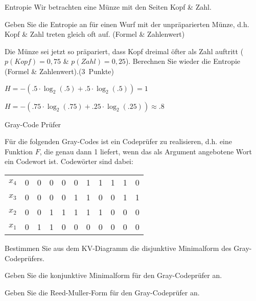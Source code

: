\documentclass{exercisesheet}
\begin{document}
\begin{eexercises}{Entropie}{
    Wir betrachten eine Münze mit den Seiten Kopf \& Zahl.
  }
  \item Geben Sie die Entropie an für einen Wurf mit der unpräparierten Münze, d.h. Kopf \& Zahl treten gleich oft auf. (Formel \& Zahlenwert)\points[3]
  \item Die Münze sei jetzt so präpariert, dass Kopf dreimal öfter als Zahl auftritt ($p(Kopf) = 0,75$ \& $p(Zahl) = 0,25$). Berechnen Sie wieder die Entropie (Formel \& Zahlenwert).(3~Punkte)
\end{eexercises}

\begin{solutions}
  \item $H = -(.5\cdot\log_2(.5) + .5\cdot\log_2(.5)) = 1$
  \item $H = -(.75\cdot\log_2(.75) + .25\cdot\log_2(.25)) \approx .8$
\end{solutions}

\begin{eexercises}{Gray-Code Prüfer}{
    Für die folgenden Gray-Codes ist ein Codeprüfer zu realisieren, d.h. eine Funktion $F$, die genau dann 1 liefert, wenn das als Argument angebotene Wort ein Codewort ist. Codewörter sind dabei:\par
    \begin{tabular}{c|cccc cccc cc}
      $x_4$ & 0 & 0 & 0 & 0 & 0 & 1 & 1 & 1 & 1 & 0 \\
      $x_3$ & 0 & 0 & 0 & 0 & 1 & 1 & 0 & 0 & 1 & 1 \\
      $x_2$ & 0 & 0 & 1 & 1 & 1 & 1 & 1 & 0 & 0 & 0 \\
      $x_1$ & 0 & 1 & 1 & 0 & 0 & 0 & 0 & 0 & 0 & 0 \\
    \end{tabular}
  }
  \item Bestimmen Sie aus dem KV-Diagramm die disjunktive Minimalform des Gray-Codeprüfers.\points[5]
  \item Geben Sie die konjunktive Minimalform für den Gray-Codeprüfer an.\points[3]
  \item Geben Sie die Reed-Muller-Form für den Gray-Codeprüfer an.\points[3]\par
\end{eexercises}
\end{document}
